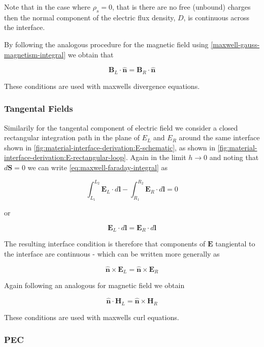 Note that in the case where $\rho_s = 0$, that is there are no free (unbound) charges then the normal component of the electric flux density, $D$, is continuous across the interface.

By following the analogous procedure for the magnetic field using \eqref{maxwell-gauss-magnetism-integral} we obtain that

$$
\mathbf{B}_L \cdot \hat{\mathbf{n}} = \mathbf{B}_R \cdot \hat{\mathbf{n}}
$$

These conditions are used with maxwells divergence equations.

\subsubsection{Tangental Fields}

Similarily for the tangental component of electric field we consider a closed rectangular integration path in the plane of $E_L$ and $E_R$ around the same interface shown in \ref{fig:material-interface-derivation:E-schematic}, as shown in \ref{fig:material-interface-derivation:E-rectangular-loop}. Again in the limit $h \to 0$ and noting that $d\mathbf{S} = 0$ we can write \eqref{eq:maxwell-faraday-integral} as

\begin{equation}
\label{eq:material-interfaces-tangentalcondition-E}
\int_{L_1}^{L_2} \mathbf{E}_L \cdot d\mathbf{l} - \int_{R_1}^{R_2} \mathbf{E}_R \cdot d \mathbf{l} = 0
\end{equation}

or

$$
\mathbf{E}_L \cdot d\mathbf{l} = \mathbf{E}_R \cdot d \mathbf{l}
$$

The resulting interface condition is therefore that components of $\mathbf{E}$ tangiental to the interface are continuous - which can be written more generally as

$$
\hat{\mathbf{n}} \times \mathbf{E}_L = \hat{\mathbf{n}} \times \mathbf{E}_R 
$$

Again following an analogous for magnetic field we obtain

$$
\hat{\mathbf{n}} \cdot \mathbf{H}_L = \hat{\mathbf{n}} \times \mathbf{H}_R
$$

These conditions are used with maxwells curl equations.

\subsubsection{PEC}

